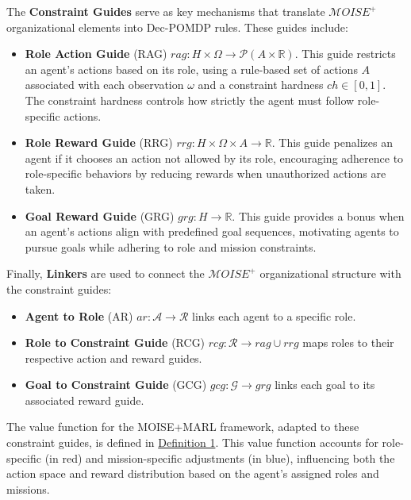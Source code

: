 \documentclass[sigconf,anonymous]{aamas}
\begin{document}
The \textbf{Constraint Guides} \quad serve as key mechanisms that translate $\mathcal{M}OISE^+$ organizational elements into Dec-POMDP rules. These guides include:

\begin{itemize}
    \item \textbf{Role Action Guide} (RAG) \quad $rag: H \times \Omega \rightarrow \mathcal{P}(A \times \mathbb{R})$. This guide restricts an agent's actions based on its role, using a rule-based set of actions $A$ associated with each observation $\omega$ and a constraint hardness $ch \in [0,1]$. The constraint hardness controls how strictly the agent must follow role-specific actions.
    \item \textbf{Role Reward Guide} (RRG) \quad $rrg: H \times \Omega \times A \to \mathbb{R}$. This guide penalizes an agent if it chooses an action not allowed by its role, encouraging adherence to role-specific behaviors by reducing rewards when unauthorized actions are taken.
    \item \textbf{Goal Reward Guide} (GRG) \quad $grg: H \rightarrow \mathbb{R}$. This guide provides a bonus when an agent's actions align with predefined goal sequences, motivating agents to pursue goals while adhering to role and mission constraints.
\end{itemize}

Finally, \textbf{Linkers} are used to connect the $\mathcal{M}OISE^+$ organizational structure with the constraint guides:
\begin{itemize}
    \item \textbf{Agent to Role} (AR) \quad $ar: \mathcal{A} \to \mathcal{R}$ links each agent to a specific role.
    \item \textbf{Role to Constraint Guide} (RCG) \quad $rcg: \mathcal{R} \rightarrow rag \cup rrg$ maps roles to their respective action and reward guides.
    \item \textbf{Goal to Constraint Guide} (GCG) \quad $gcg: \mathcal{G} \rightarrow grg$ links each goal to its associated reward guide.
\end{itemize}

The value function for the MOISE+MARL framework, adapted to these constraint guides, is defined in \hyperref[eq:single_value_function]{Definition 1}. This value function accounts for role-specific (in red) and mission-specific adjustments (in blue), influencing both the action space and reward distribution based on the agent's assigned roles and missions.
\end{document}
